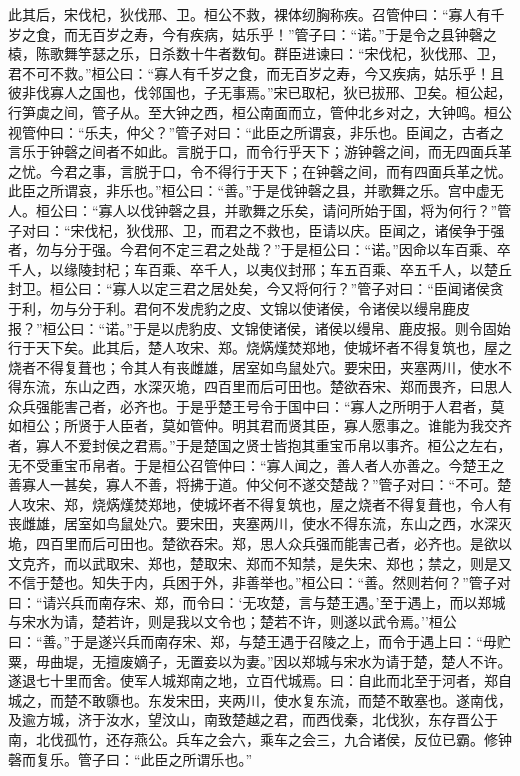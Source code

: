 \documentclass[]{article}
\begin{document}
此其后，宋伐杞，狄伐邢、卫。桓公不救，裸体纫胸称疾。召管仲曰：``寡人有千岁之食，而无百岁之寿，今有疾病，姑乐乎！''管子曰：``诺。''于是令之县钟磬之榬，陈歌舞竽瑟之乐，日杀数十牛者数旬。群臣进谏曰：``宋伐杞，狄伐邢、卫，君不可不救。''桓公曰：``寡人有千岁之食，而无百岁之寿，今又疾病，姑乐乎！且彼非伐寡人之国也，伐邻国也，子无事焉。''宋已取杞，狄已拔邢、卫矣。桓公起，行笋虡之间，管子从。至大钟之西，桓公南面而立，管仲北乡对之，大钟鸣。桓公视管仲曰：``乐夫，仲父？''管子对曰：``此臣之所谓哀，非乐也。臣闻之，古者之言乐于钟磬之间者不如此。言脱于口，而令行乎天下；游钟磬之间，而无四面兵革之忧。今君之事，言脱于口，令不得行于天下；在钟磬之间，而有四面兵革之忧。此臣之所谓哀，非乐也。''桓公曰：``善。''于是伐钟磬之县，并歌舞之乐。宫中虚无人。桓公曰：``寡人以伐钟磬之县，并歌舞之乐矣，请问所始于国，将为何行？''管子对曰：``宋伐杞，狄伐邢、卫，而君之不救也，臣请以庆。臣闻之，诸侯争于强者，勿与分于强。今君何不定三君之处哉？''于是桓公曰：``诺。''因命以车百乘、卒千人，以缘陵封杞；车百乘、卒千人，以夷仪封邢；车五百乘、卒五千人，以楚丘封卫。桓公曰：``寡人以定三君之居处矣，今又将何行？''管子对曰：``臣闻诸侯贪于利，勿与分于利。君何不发虎豹之皮、文锦以使诸侯，令诸侯以缦帛鹿皮报？''桓公曰：``诺。''于是以虎豹皮、文锦使诸侯，诸侯以缦帛、鹿皮报。则令固始行于天下矣。此其后，楚人攻宋、郑。烧焫熯焚郑地，使城坏者不得复筑也，屋之烧者不得复葺也；令其人有丧雌雄，居室如鸟鼠处穴。要宋田，夹塞两川，使水不得东流，东山之西，水深灭垝，四百里而后可田也。楚欲吞宋、郑而畏齐，曰思人众兵强能害己者，必齐也。于是乎楚王号令于国中曰：``寡人之所明于人君者，莫如桓公；所贤于人臣者，莫如管仲。明其君而贤其臣，寡人愿事之。谁能为我交齐者，寡人不爱封侯之君焉。''于是楚国之贤士皆抱其重宝币帛以事齐。桓公之左右，无不受重宝币帛者。于是桓公召管仲曰：``寡人闻之，善人者人亦善之。今楚王之善寡人一甚矣，寡人不善，将拂于道。仲父何不遂交楚哉？''管子对曰：``不可。楚人攻宋、郑，烧焫熯焚郑地，使城坏者不得复筑也，屋之烧者不得复葺也，令人有丧雌雄，居室如鸟鼠处穴。要宋田，夹塞两川，使水不得东流，东山之西，水深灭垝，四百里而后可田也。楚欲吞宋。郑，思人众兵强而能害己者，必齐也。是欲以文克齐，而以武取宋、郑也，楚取宋、郑而不知禁，是失宋、郑也；禁之，则是又不信于楚也。知失于内，兵困于外，非善举也。''桓公曰：``善。然则若何？''管子对曰：``请兴兵而南存宋、郑，而令曰：`无攻楚，言与楚王遇。'至于遇上，而以郑城与宋水为请，楚若许，则是我以文令也；楚若不许，则遂以武令焉。''桓公曰：``善。''于是遂兴兵而南存宋、郑，与楚王遇于召陵之上，而令于遇上曰：``毋贮粟，毋曲堤，无擅废嫡子，无置妾以为妻。''因以郑城与宋水为请于楚，楚人不许。遂退七十里而舍。使军人城郑南之地，立百代城焉。曰：自此而北至于河者，郑自城之，而楚不敢隳也。东发宋田，夹两川，使水复东流，而楚不敢塞也。遂南伐，及逾方城，济于汝水，望汶山，南致楚越之君，而西伐秦，北伐狄，东存晋公于南，北伐孤竹，还存燕公。兵车之会六，乘车之会三，九合诸侯，反位已霸。修钟磬而复乐。管子曰：``此臣之所谓乐也。''
\end{document}
